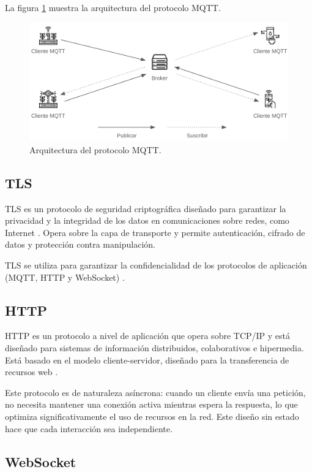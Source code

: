 La figura \ref{fig:MqttProtocol} muestra la arquitectura del protocolo MQTT.

\begin{figure}[H]
	\centering
	\includegraphics[width=.70\textwidth]{./Images/2.png}
	\caption{Arquitectura del protocolo MQTT.}
	\label{fig:MqttProtocol}
\end{figure}

\subsection{TLS}

TLS es un protocolo de seguridad criptográfica diseñado para garantizar la
privacidad y la integridad de los datos en comunicaciones sobre redes, como
Internet \cite{tls}. Opera sobre la capa de transporte y permite autenticación,
cifrado de datos y protección contra manipulación.

TLS se utiliza para garantizar la confidencialidad de los protocolos de
aplicación (MQTT, HTTP y WebSocket) \cite{awsiot_tls}.

\subsection{HTTP}

HTTP es un protocolo a nivel de aplicación que opera sobre TCP/IP y está
diseñado para sistemas de información distribuidos, colaborativos e hipermedia.
Está basado en el modelo cliente-servidor, diseñado para la transferencia de
recursos web \cite{rfc2616}.

Este protocolo es de naturaleza asíncrona: cuando un cliente envía una
petición, no necesita mantener una conexión activa mientras espera la
respuesta, lo que optimiza significativamente el uso de recursos en la red.
Este diseño sin estado hace que cada interacción sea independiente.

\subsection{WebSocket}

